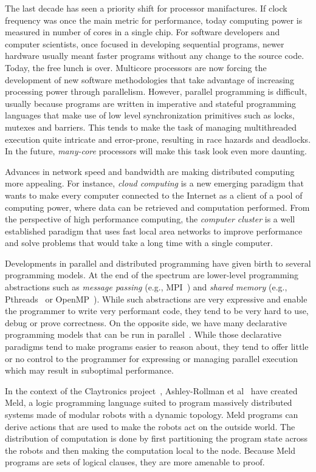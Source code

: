 
The last decade has seen a priority shift for processor manifactures. If clock frequency
was once the main metric for performance, today computing power is measured in number of
cores in a single chip.
For software developers and computer scientists, once focused in developing sequential programs,
newer hardware usually meant faster programs without any change to the source code. Today,
the free lunch is over. Multicore processors are now forcing the development of
new software methodologies that take advantage of increasing processing power through parallelism.
However, parallel programming is difficult, usually because programs are written
in imperative and stateful programming languages that make use of low level synchronization
primitives such as locks, mutexes and barriers. This tends to make the task of managing multithreaded
execution quite intricate and error-prone, resulting in race hazards and deadlocks.
In the future, \emph{many-core} processors will make this task look even more daunting.

Advances in network speed and bandwidth are making distributed computing
more appealing. For instance, \emph{cloud computing} is a new emerging paradigm that wants
to make every computer connected to the Internet as a client of a pool of computing power,
where data can be retrieved and computation performed. From the perspective of high performance
computing, the \emph{computer cluster} is a well established paradigm that uses fast local area
networks to improve performance and solve problems that would take a long time with a single computer.

Developments in parallel and distributed programming have given birth to several programming models.
At the end of the spectrum are lower-level programming abstractions such as
\emph{message passing} (e.g., MPI~\cite{gabriel04-open-mpi}) and \emph{shared memory}
(e.g., Pthreads~\cite{Butenhof:1997:PPT:263953} or OpenMP~\cite{Chapman-2007-UOP-1370966}).
While such abstractions are very expressive and enable the programmer to write very performant code,
they tend to be very hard to use, debug or prove correctness.
On the opposite side, we have many declarative programming models
that can be run in parallel~\cite{Blelloch:1996:PPA:227234.227246}.
While those declarative paradigms tend to make programs easier to reason about, they tend to offer
little or no control to the programmer for expressing or managing parallel execution
which may result in suboptimal performance.

In the context of the Claytronics project~\cite{goldstein-computer05}, Ashley-Rollman et
al~\cite{ashley-rollman-iclp09, ashley-rollman-derosa-iros07wksp} have created Meld, a logic programming language suited to
program massively distributed systems made of modular robots with a dynamic topology. Meld programs can derive actions that are used
to make the robots act on the outside world. The distribution of computation is done
by first partitioning the program state across the robots and then making the computation local to the node. Because Meld programs
are sets of logical clauses, they are more amenable to proof.

